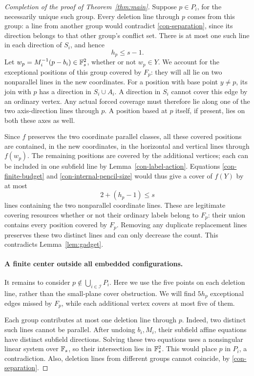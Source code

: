 \begin{proof}[Completion of the proof of Theorem~\ref{thm:main}]
Suppose \(p\in P_i\), for the necessarily unique such group.
Every deletion line through \(p\) comes from this group: a line
from another group would contradict \eqref{con-separation}, since
its direction belongs to that other group's conflict set.  There
is at most one such line in each direction of \(S_i\), and hence
\begin{equation}
\label{con-internal-pencil-size}
 h_p\le s-1.
\end{equation}
Let \(w_p=M_i^{-1}(p-b_i)\in\mathbb F_s^2\), whether or not
\(w_p\in Y\).  We account for the exceptional positions of this
group covered by \(F_p\): they will all lie on two nonparallel
lines in the new coordinates.  For a position with base point
\(y\ne p\), its join with \(p\) has a direction in
\(S_i\cup A_i\).  A direction in \(S_i\) cannot cover this
edge by an ordinary vertex.  Any actual forced coverage must
therefore lie along one of the two axis-direction lines through
\(p\).  A position based at \(p\) itself, if present, lies on
both these axes as well.

Since \(f\) preserves the two coordinate parallel classes, all
these covered positions are contained, in the new coordinates, in
the horizontal and vertical lines through \(f(w_p)\).  The
remaining positions are covered by the additional vertices; each
can be included in one subfield line by
Lemma~\ref{con-label-action}.  Equations
\eqref{con-finite-budget} and \eqref{con-internal-pencil-size}
would thus give a cover of \(f(Y)\) by at most
\[
 2+(h_p-1)\le s
\]
lines containing the two nonparallel coordinate lines. These
are legitimate covering resources whether or not their ordinary labels
belong to \(F_p\): their union contains every position covered by
\(F_p\). Removing any duplicate replacement lines preserves these
two distinct lines and can only decrease the count.  This contradicts
Lemma~\ref{lem:gadget}.

\paragraph{A finite center outside all embedded configurations.}
It remains to consider \(p\notin\bigcup_{i\in\mathcal I}P_i\).
Here we use the five points on each deletion line, rather than the
small-plane cover obstruction.  We will find \(5h_p\) exceptional
edges missed by \(F_p\), while each additional vertex covers at
most five of them.

Each group contributes at most one deletion line through \(p\).
Indeed, two distinct such lines cannot be parallel.  After undoing
\(b_i,M_i\), their subfield affine equations have distinct
subfield directions.  Solving these two equations uses a
nonsingular linear system over \(\mathbb F_s\), so their intersection
lies in \(\mathbb F_s^2\).  This would place \(p\) in \(P_i\), a
contradiction.  Also, deletion lines from different groups cannot
coincide, by \eqref{con-separation}.


\end{proof}
